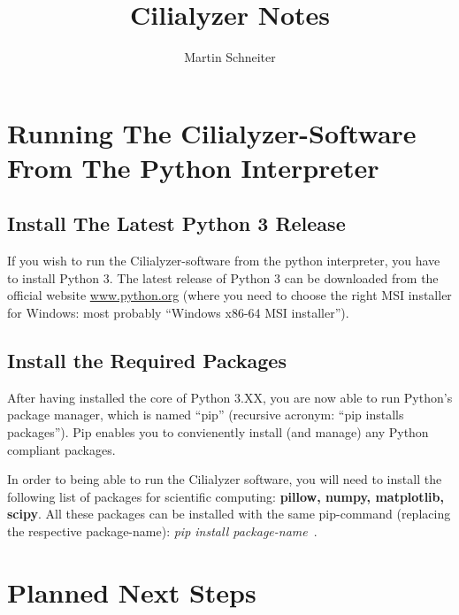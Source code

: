 \documentclass{article}
\begin{document}
\title{Cilialyzer Notes}
\author{Martin Schneiter}

\maketitle

\section{Running The Cilialyzer-Software From The Python Interpreter}
\subsection{Install The Latest Python 3 Release}
If you wish to run the Cilialyzer-software from the python interpreter, 
you have to install Python 3. 
The latest release of Python 3 can be downloaded from the 
official website \url{www.python.org}
(where you need to choose the right MSI installer for Windows: 
most probably ``Windows x86-64 MSI installer''). 
\subsection{Install the Required Packages}
After having installed the core of Python 3.XX, you are now able to 
run Python's package manager, which is named ``pip''
(recursive acronym: ``pip installs packages''). 
Pip enables you to convienently install (and manage) any Python compliant 
packages.\par
In order to being able to run the Cilialyzer software, 
you will need to install the following list of packages for scientific 
computing: \textbf{pillow, numpy, matplotlib, scipy}. 
All these packages can be installed with the same pip-command 
(replacing the respective package-name): 
\textit{pip install package-name}~.


\section{Planned Next Steps}
\end{document}
